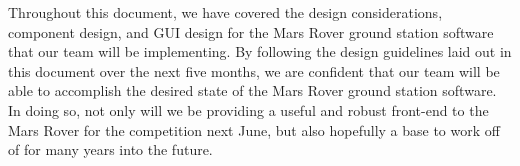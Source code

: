 Throughout this document, we have covered the design considerations, component design, and GUI design for the Mars Rover ground station software that our team will be implementing.
By following the design guidelines laid out in this document over the next five months, we are confident that our team will be able to accomplish the desired state of the Mars Rover ground station software.
In doing so, not only will we be providing a useful and robust front-end to the Mars Rover for the competition next June, but also hopefully a base to work off of for many years into the future.